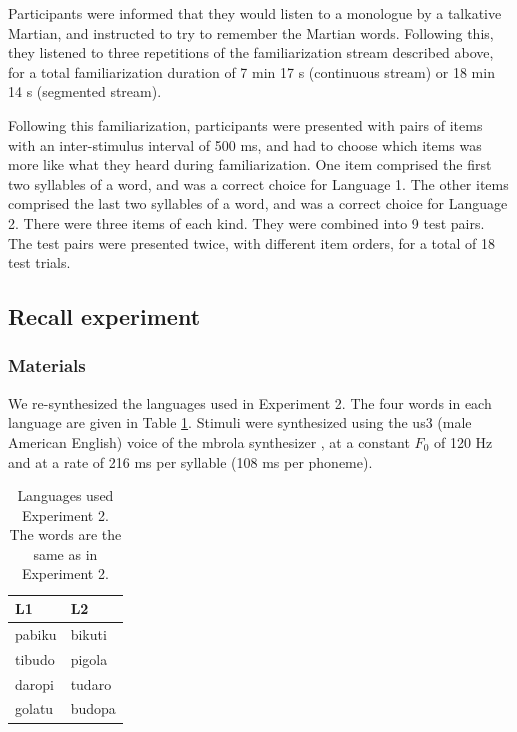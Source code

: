 \documentclass[]{article}
\begin{document}
Participants were informed that they would listen to a monologue by a talkative Martian, and instructed to try to remember the Martian words. Following this, they listened to three repetitions of the familiarization stream described above, for a total familiarization duration of 7 min 17 s (continuous stream) or 18 min 14 s (segmented stream).

Following this familiarization, participants were presented with pairs of items with an inter-stimulus interval of 500 ms, and had to choose which items was more like what they heard during familiarization. One item comprised the first two syllables of a word, and was a correct choice for Language 1. The other items comprised the last two syllables of a word, and was a correct choice for Language 2. There were three items of each kind. They were combined into 9 test pairs. The test pairs were presented twice, with different item orders, for a total of 18 test trials.

\subsection{Recall experiment}\label{recall-experiment}

\subsubsection{Materials}\label{materials}

We re-synthesized the languages used in \citet{Saffran-Science} Experiment 2. The four words in each language are given in Table \ref{tab:recall-languages}. Stimuli were synthesized using the us3 (male American English) voice of the mbrola synthesizer \citep{mbrola}, at a constant \(F_0\) of 120 Hz and at a rate of 216 ms per syllable (108 ms per phoneme).

\begin{table}[hbp]

\caption{\label{tab:recall-print-languages}\label{tab:recall-languages}Languages used Experiment 2. The words are the same as in \cite{Saffran-Science} Experiment 2.}
\centering
\begin{tabular}[t]{ll}
\toprule
L1 & L2\\
\midrule
pabiku & bikuti\\
tibudo & pigola\\
daropi & tudaro\\
golatu & budopa\\
\bottomrule
\end{tabular}
\end{table}
\end{document}
